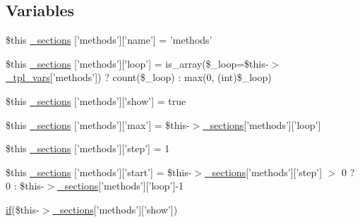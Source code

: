 \subsection*{\-Variables}
\begin{DoxyCompactItemize}
\item 
\$this \hyperlink{34d6fa4bfd5eef6424a9ddc74a166350_2_06_06-14_05_06_06-1407541581_05method_8tpl_8php_a139f2cab9e3cbc6b906971adb64bdd78}{\-\_\-sections} \mbox{[}'methods'\mbox{]}\mbox{[}'name'\mbox{]} = 'methods'
\item 
\$this \hyperlink{34d6fa4bfd5eef6424a9ddc74a166350_2_06_06-14_05_06_06-1407541581_05method_8tpl_8php_ad2a81d4f56456e84bac7eb16d5214882}{\-\_\-sections} \mbox{[}'methods'\mbox{]}\mbox{[}'loop'\mbox{]} = is\-\_\-array(\$\-\_\-loop=\$this-\/$>$\hyperlink{_06_06127_05_06_0612781687_05pkgelementindex_8tpl_8php_a4a4846d8e68d455590131a05697f67a3}{\-\_\-tpl\-\_\-vars}\mbox{[}'methods'\mbox{]}) ? count(\$\-\_\-loop) \-: max(0, (int)\$\-\_\-loop)
\item 
\$this \hyperlink{34d6fa4bfd5eef6424a9ddc74a166350_2_06_06-14_05_06_06-1407541581_05method_8tpl_8php_a00d4d90d9dd571d0f3d80c1a9918a7ba}{\-\_\-sections} \mbox{[}'methods'\mbox{]}\mbox{[}'show'\mbox{]} = true
\item 
\$this \hyperlink{34d6fa4bfd5eef6424a9ddc74a166350_2_06_06-14_05_06_06-1407541581_05method_8tpl_8php_abbdaba9e727b1127d22dd8d909673da3}{\-\_\-sections} \mbox{[}'methods'\mbox{]}\mbox{[}'max'\mbox{]} = \$this-\/$>$\hyperlink{_06_06127_05_06_0612781687_05pkgelementindex_8tpl_8php_a9e3d26b39edfe29c3f29b8035ef33828}{\-\_\-sections}\mbox{[}'methods'\mbox{]}\mbox{[}'loop'\mbox{]}
\item 
\$this \hyperlink{34d6fa4bfd5eef6424a9ddc74a166350_2_06_06-14_05_06_06-1407541581_05method_8tpl_8php_ad8259cd643f0fbbc6ea85de93ed08e9d}{\-\_\-sections} \mbox{[}'methods'\mbox{]}\mbox{[}'step'\mbox{]} = 1
\item 
\$this \hyperlink{34d6fa4bfd5eef6424a9ddc74a166350_2_06_06-14_05_06_06-1407541581_05method_8tpl_8php_aeeffbf5fc6db9e3f1c3c1174ce219f4f}{\-\_\-sections} \mbox{[}'methods'\mbox{]}\mbox{[}'start'\mbox{]} = \$this-\/$>$\hyperlink{_06_06127_05_06_0612781687_05pkgelementindex_8tpl_8php_a9e3d26b39edfe29c3f29b8035ef33828}{\-\_\-sections}\mbox{[}'methods'\mbox{]}\mbox{[}'step'\mbox{]} $>$ 0 ? 0 \-: \$this-\/$>$\hyperlink{_06_06127_05_06_0612781687_05pkgelementindex_8tpl_8php_a9e3d26b39edfe29c3f29b8035ef33828}{\-\_\-sections}\mbox{[}'methods'\mbox{]}\mbox{[}'loop'\mbox{]}-\/1
\item 
\hyperlink{_setup_8inc_8php_ad0184337b31d13763ec8751feff4aabe}{if}(\$this-\/$>$\hyperlink{_06_06127_05_06_0612781687_05pkgelementindex_8tpl_8php_a9e3d26b39edfe29c3f29b8035ef33828}{\-\_\-sections}\mbox{[}'methods'\mbox{]}\mbox{[}'show'\mbox{]}) \*

\end{DoxyCompactItemize}
